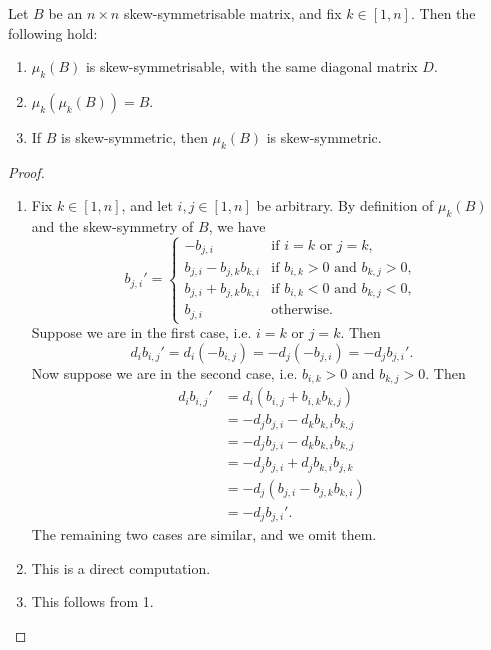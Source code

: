 \begin{lemma}
    \label{lem:mutationProperties}
    Let $B$ be an $n \times n$ skew-symmetrisable matrix, and fix $k \in [1,n]$. Then the following hold:
    \begin{enumerate}
        \item $\mu_k(B)$ is skew-symmetrisable, with the same diagonal matrix $D$.
        \item $\mu_k(\mu_k(B)) = B$.
        \item If $B$ is skew-symmetric, then $\mu_k(B)$ is skew-symmetric.
    \end{enumerate}
\end{lemma}
\begin{proof}
    \begin{enumerate}   
        \item Fix $k \in [1,n]$, and let $i,j \in [1,n]$ be arbitrary. By definition of $\mu_k(B)$ and the 
        skew-symmetry of $B$, we have
\[
        b_{j,i}' = \begin{cases}
            -b_{j,i} & \text{if } i = k \text{ or } j = k, \\
            b_{j,i} - b_{j,k}b_{k,i} & \text{if } b_{i,k} >0 \text{ and } b_{k,j} > 0, \\
            b_{j,i} + b_{j,k}b_{k,i} & \text{if } b_{i,k} <0 \text{ and } b_{k,j} < 0, \\
            b_{j,i} & \text{otherwise.}
        \end{cases}
\]
Suppose we are in the first case, i.e. $i=k$ or $j = k$. Then 
\[
        d_i b_{i,j}' = d_i (-b_{i,j}) = - d_j (- b_{j,i}) = - d_j b_{j,i}'.
\]
Now suppose we are in the second case, i.e. $b_{i,k} > 0$ and $b_{k,j} > 0$. Then
\begin{align*}
        d_i b_{i,j}' &= d_i (b_{i,j} + b_{i,k}b_{k,j})\\
                    &= - d_j b_{j,i} - d_k b_{k,i}b_{k,j} \\
                    &= - d_j b_{j,i} - d_k b_{k,i}b_{k,j} \\
                    &= - d_j b_{j,i} + d_j b_{k,i}b_{j,k} \\
                    &= - d_j (b_{j,i} - b_{j,k}b_{k,i}) \\
                    &= - d_j b_{j,i}'.
\end{align*}
The remaining two cases are similar, and we omit them. 
        \item This is a direct computation.
        \item This follows from 1. 
    \end{enumerate}
\end{proof}